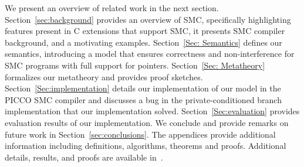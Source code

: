 We present an overview of related work in the next section. Section~\ref{sec:background}  provides an overview of SMC, specifically highlighting features present in C extensions that support SMC, it presents SMC compiler background, and a motivating examples.
Section~\ref{Sec: Semantics} defines our semantics, introducing a model that ensures correctness and non-interference for SMC programs with full support for pointers.  Section~\ref{Sec: Metatheory} formalizes our metatheory and provides proof sketches.  Section~\ref{Sec:implementation} details our implementation of our model in the PICCO SMC compiler and  discusses a bug in the private-conditioned branch implementation that our
implementation solved.  Section~\ref{Sec:evaluation} provides evaluation results of our implementation.  We conclude and provide remarks on future work in Section~\ref{sec:conclusions}. The appendices provide additional information including definitions, algorithms, theorems and proofs. Additional details, results, and proofs are available in~\cite{amys-dissertation}.




